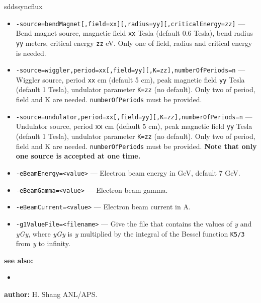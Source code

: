 \begin{sddsprog}{sddssyncflux}
\begin{itemize}
      \item \verb|-source=bendMagnet[,field=xx][,radius=yy][,criticalEnergy=zz]| --- Bend magnet source, magnetic field \verb|xx| Tesla (default 0.6 Tesla), bend radius \verb|yy| meters, critical energy \verb|zz| eV. Only one of field, radius and critical energy is needed.
      \item \verb|-source=wiggler,period=xx[,field=yy][,K=zz],numberOfPeriods=n| --- Wiggler source, period \verb|xx| cm (default 5 cm), peak magnetic field \verb|yy| Tesla (default 1 Tesla), undulator parameter \verb|K=zz| (no default). Only two of period, field and K are needed. \verb|numberOfPeriods| must be provided.
      \item \verb|-source=undulator,period=xx[,field=yy][,K=zz],numberOfPeriods=n| --- Undulator source, period \verb|xx| cm (default 5 cm), peak magnetic field \verb|yy| Tesla (default 1 Tesla), undulator parameter \verb|K=zz| (no default). Only two of period, field and K are needed. \verb|numberOfPeriods| must be provided. \textbf{Note that only one source is accepted at one time.}
      \item \verb|-eBeamEnergy=<value>| --- Electron beam energy in GeV, default 7 GeV.
      \item \verb|-eBeamGamma=<value>| --- Electron beam gamma.
      \item \verb|-eBeamCurrent=<value>| --- Electron beam current in A.
      \item \verb|-g1ValueFile=<filename>| --- Give the file that contains the values of \emph{y} and \emph{yGy}, where \emph{yGy} is \emph{y} multiplied by the integral of the Bessel function \verb|K5/3| from \emph{y} to infinity.
    \end{itemize}
  \item \textbf{see also:}
    \begin{itemize}
      \item {}
    \end{itemize}
  \item \textbf{author:} H. Shang ANL/APS.
\end{sddsprog}

